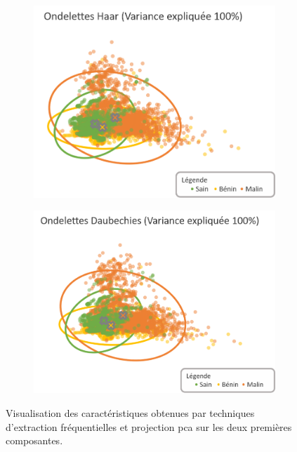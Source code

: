 \begin{figure}[p]
    \begin{subfigure}{.49\textwidth}
      \includegraphics[width=\textwidth]{contents/chapter_5/resources/visualisation_frequency_Haar.png}
    \end{subfigure}    
    \begin{subfigure}{.49\textwidth}
      \includegraphics[width=\textwidth]{contents/chapter_5/resources/visualisation_frequency_Daubechies.png}
    \end{subfigure}\vspace{10mm}
    
    \caption{Visualisation des caractéristiques obtenues par techniques d'extraction fréquentielles et projection \gls{pca} sur les deux premières composantes.}
    \label{fig:visualisation_frequency}
\end{figure}\par

